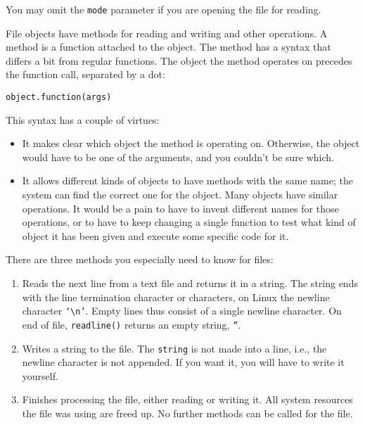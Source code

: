 You may omit the \texttt{mode} parameter if you are opening the file for reading.

File objects have methods for
reading and writing and other operations. A method is a function
attached to the object. The method has a syntax that differs a bit from
regular functions. The object the method operates on precedes the
function call, separated by a dot:

\begin{verbatim}
object.function(args)
\end{verbatim}

This syntax has a couple of
virtues:

\begin{itemize}

\item
  It makes clear which object the
  method is operating on. Otherwise, the object would have to be one of
  the arguments, and you couldn't be sure which.
\item
  It allows different kinds of
  objects to have methods with the same name; the system can find the
  correct one for the object. Many objects have similar operations. It
  would be a pain to have to invent different names for those
  operations, or to have to keep changing a single function to test what
  kind of object it has been given and execute some specific code for
  it.
\end{itemize}

There are three methods you
especially need to know for files:

\begin{enumerate}

\item
  Reads the
  next line from a text file and returns it in a string. The string ends
  with the line termination character or characters, on Linux the
  newline character \texttt{`\textbackslash{}n'}. Empty lines thus
  consist of a single newline character. On end of file,
  \texttt{readline()} returns an empty string, \texttt{''}.
\item
  Writes
  a string to the file. The \texttt{string} is not made into a line, i.e.,
  the newline character is not appended. If you want it, you will have
  to write it yourself.
\item
  Finishes
  processing the file, either reading or writing it. All system
  resources the file was using are freed up. No further methods can be
  called for the file.
\end{enumerate}

